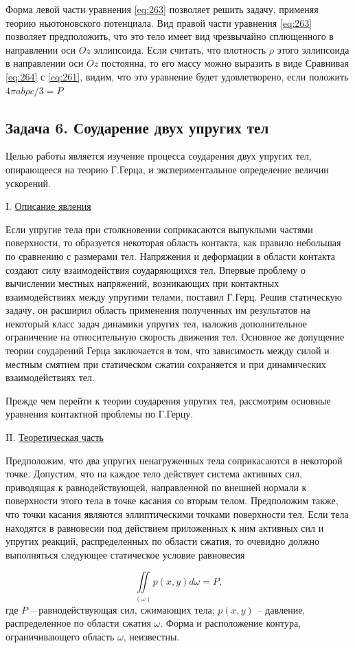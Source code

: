 \documentclass[specialist, subf, href, colorlinks=true, 14pt, final]{disser}
\theoremstyle{definition}
\newcommand{\anonsubsection}[1]{\subsection*{#1}\addcontentsline{toc}{subsection}{#1}}
\newcommand{\npart}[2]{\noindent #1. \underline{#2}}
\begin{document}
Форма левой части уравнения \eqref{eq:263} позволяет решить задачу, применяя теорию ньютоновского потенциала. Вид правой части уравнения \eqref{eq:263} позволяет предположить, что это тело имеет вид чрезвычайно сплющенного в направлении оси $Oz$ эллипсоида. Если считать, что плотность $\rho$ этого эллипсоида в направлении оси $Oz$ постоянна, то его массу можно выразить в виде
%
Сравнивая \eqref{eq:264} с \eqref{eq:261}, видим, что это уравнение будет удовлетворено, если положить $4\pi ab\rho c / 3 = P$

\newpage
\anonsubsection{Задача 6. Соударение двух упругих тел}

Целью работы является изучение процесса соударения двух упругих тел, опирающееся на теорию Г.Герца, и экспериментальное определение величин ускорений.

\npart{I}{Описание явления}

Если упругие тела при столкновении соприкасаются выпуклыми частями поверхности, то образуется некоторая область контакта, как правило небольшая по сравнению с размерами тел. Напряжения и деформации в области контакта создают силу взаимодействия соударяющихся тел. Впервые проблему о вычислении местных напряжений, возникающих при контактных взаимодействиях между упругими телами, поставил Г.Герц. Решив статическую задачу, он расширил область применения полученных им результатов на некоторый класс задач динамики упругих тел, наложив дополнительное ограничение на относительную скорость движения тел. Основное же допущение теории соударений Герца заключается в том, что  зависимость между силой и местным смятием при статическом сжатии сохраняется и при динамических взаимодействиях тел. 

Прежде чем перейти к теории соударения упругих тел, рассмотрим основные уравнения контактной проблемы по Г.Герцу. 

\npart{II}{Теоретическая часть}

Предположим, что два упругих ненагруженных тела соприкасаются в некоторой точке. Допустим, что на каждое тело действует система активных сил, приводящая к равнодействующей, направленной по внешней нормали к поверхности этого тела в точке касания со вторым телом. Предположим также, что точки касания являются эллиптическими точками поверхности тел. Если тела находятся в равновесии под действием приложенных к ним активных сил и упругих реакций, распределенных по области сжатия, то очевидно должно выполняться следующее статическое условие равновесия
\addtocounter{equation}{1}
\begin{equation}\label{eq:261}
  \iint\limits_{(\omega)} p(x,y)d\omega = P,
  \tag{1}
\end{equation} 
где $P$ -- равнодействующая сил, сжимающих тела; $p(x,y)$ -- давление, распределенное по области сжатия $\omega$. Форма и расположение контура, ограничивающего область $\omega$, неизвестны.
\end{document}

